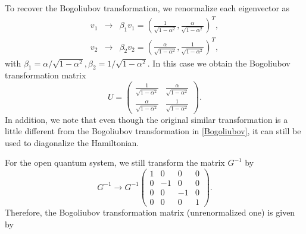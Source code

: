 \documentclass[aps,onecolumn,superscriptaddress,notitlepage,longbibliography]{revtex4-1}
\begin{document}
To recover the Bogoliubov transformation, we renormalize each eigenvector as
\begin{eqnarray}
  v_1 & \rightarrow & \beta_1 v_1 = \left( \frac{1}{\sqrt{1 - \alpha^2}},
  \frac{\alpha}{\sqrt{1 - \alpha^2}} \right)^T, \\
  v_2 & \rightarrow & \beta_2 v_2 = \left( \frac{\alpha}{\sqrt{1 - \alpha^2}},
  \frac{1}{\sqrt{1 - \alpha^2}} \right)^T, 
\end{eqnarray}
with $\beta_1 = \alpha / \sqrt{1 - \alpha^2}, \beta_2 = 1 / \sqrt{1 -
\alpha^2}$. In this case we obtain the Bogoliubov transformation matrix
\begin{equation}
  U = \left(\begin{array}{cc}
    \frac{1}{\sqrt{1 - \alpha^2}} & \frac{\alpha}{\sqrt{1 - \alpha^2}}\\
    \frac{\alpha}{\sqrt{1 - \alpha^2}} & \frac{1}{\sqrt{1 - \alpha^2}}
  \end{array}\right) . \label{Bogoliubov}
\end{equation}
In addition, we note that even though the original similar transformation is a
little different from the Bogoliubov transformation in \eqref{Bogoliubov}, it
can still be used to diagonalize the Hamiltonian.

For the open quantum system, we still transform the matrix $G^{- 1}$ by
\begin{equation}
  G^{- 1} \rightarrow G^{- 1} \left(\begin{array}{cccc}
    1 & 0 & 0 & 0\\
    0 & - 1 & 0 & 0\\
    0 & 0 & - 1 & 0\\
    0 & 0 & 0 & 1
  \end{array}\right) .
\end{equation}
Therefore, the Bogoliubov transformation matrix (unrenormalized one) is given
by
\end{document}
